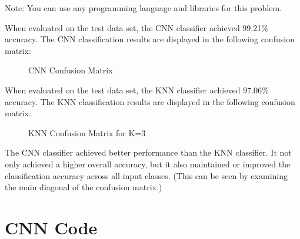 \documentclass[fleqn]{article}
\begin{document}
\begin{enumerate}
		Note: You can use any programming language and libraries for this \newline problem.
		
		\pagebreak
		
		When evaluated on the test data set, the CNN classifier achieved 99.21\% accuracy. The CNN classification results are displayed in the following confusion matrix:
		
		\begin{figure}[H]
			\centerline{}
			\caption{CNN Confusion Matrix}
			\label{cnn_confusion_matrix}
		\end{figure}
		
		When evaluated on the test data set, the KNN classifier achieved 97.06\% accuracy. The KNN classification results are displayed in the following confusion matrix:
		
		\begin{figure}[H]
			\centerline{}
			\caption{KNN Confusion Matrix for K=3}
			\label{knn_confusion_matrix}
		\end{figure}		
	
		The CNN classifier achieved better performance than the KNN classifier. It not only achieved a higher overall accuracy, but it also maintained or improved the classification accuracy across all input classes. (This can be seen by examining the main diagonal of the confusion matrix.)
	
	\end{enumerate}
	
	\pagebreak
	\appendix
	\section{CNN Code}
	\label{cnn_code}
	\lstset{style=Matlab-editor,basicstyle=\ttfamily\footnotesize}
	
	
	
	\raggedbottom
\end{document}
